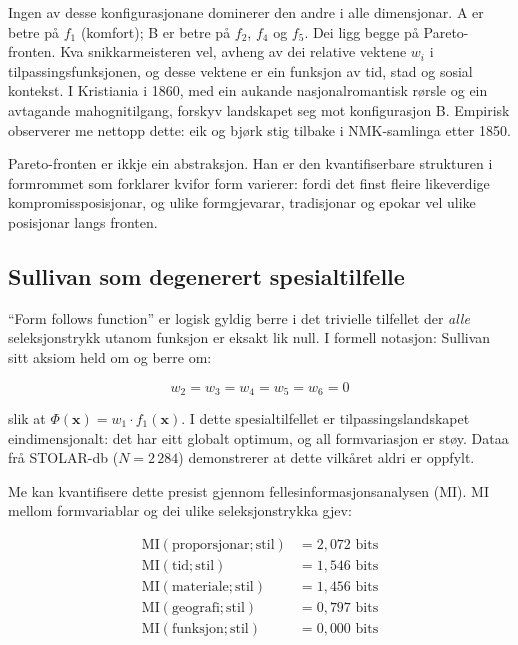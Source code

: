 \documentclass[10pt, a4paper, twocolumn]{article}
\begin{document}
Ingen av desse konfigurasjonane dominerer den andre i alle dimensjonar. A er betre på $f_1$ (komfort); B er betre på $f_2$, $f_4$ og $f_5$. Dei ligg begge på Pareto-fronten. Kva snikkarmeisteren vel, avheng av dei relative vektene $w_i$ i tilpassingsfunksjonen, og desse vektene er ein funksjon av tid, stad og sosial kontekst. I Kristiania i 1860, med ein aukande nasjonalromantisk rørsle og ein avtagande mahognitilgang, forskyv landskapet seg mot konfigurasjon B. Empirisk observerer me nettopp dette: eik og bjørk stig tilbake i NMK-samlinga etter 1850.

Pareto-fronten er ikkje ein abstraksjon. Han er den kvantifiserbare strukturen i formrommet som forklarer kvifor form varierer: fordi det finst fleire likeverdige kompromissposisjonar, og ulike formgjevarar, tradisjonar og epokar vel ulike posisjonar langs fronten.


\subsection{Sullivan som degenerert spesialtilfelle}

``Form follows function'' er logisk gyldig berre i det trivielle tilfellet der \emph{alle} seleksjonstrykk utanom funksjon er eksakt lik null. I formell notasjon: Sullivan sitt aksiom held om og berre om:

\begin{equation}
  w_2 = w_3 = w_4 = w_5 = w_6 = 0
\end{equation}

\noindent slik at $\Phi(\mathbf{x}) = w_1 \cdot f_1(\mathbf{x})$. I dette spesialtilfellet er tilpassingslandskapet eindimensjonalt: det har eitt globalt optimum, og all formvariasjon er støy. Dataa frå STOLAR-db ($N = 2\,284$) demonstrerer at dette vilkåret aldri er oppfylt.

Me kan kvantifisere dette presist gjennom fellesinformasjonsanalysen (MI). MI mellom formvariablar og dei ulike seleksjonstrykka gjev:

\begin{align}
  \text{MI}(\text{proporsjonar}; \text{stil}) &= 2{,}072 \text{ bits} \\
  \text{MI}(\text{tid}; \text{stil}) &= 1{,}546 \text{ bits} \\
  \text{MI}(\text{materiale}; \text{stil}) &= 1{,}456 \text{ bits} \\
  \text{MI}(\text{geografi}; \text{stil}) &= 0{,}797 \text{ bits} \\
  \text{MI}(\text{funksjon}; \text{stil}) &= 0{,}000 \text{ bits}
\end{align}
\end{document}
